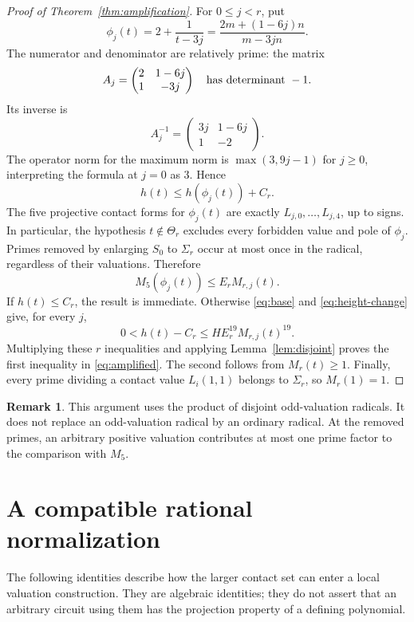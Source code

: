 \documentclass[11pt,a4paper]{article}
\theoremstyle{definition}\newtheorem{definition}[theorem]{Definition}
\newtheorem{remark}[theorem]{Remark}
\begin{document}
\begin{proof}[Proof of Theorem~\ref{thm:amplification}]
For $0\le j<r$, put
\[
 \phi_j(t)=2+\frac1{t-3j}
          =\frac{2m+(1-6j)n}{m-3jn}.
\]
The numerator and denominator are relatively prime: the matrix
\[
 A_j=\begin{pmatrix}2&1-6j\\1&-3j\end{pmatrix}
 \quad\hbox{has determinant }-1.
\]
Its inverse is
\[
 A_j^{-1}=\begin{pmatrix}3j&1-6j\\1&-2\end{pmatrix}.
\]
The operator norm for the maximum norm is
$\max(3,9j-1)$ for $j\ge0$, interpreting the formula at $j=0$
as $3$. Hence
\begin{equation}\label{eq:height-change}
 h(t)\le h(\phi_j(t))+C_r.
\end{equation}
The five projective contact forms for $\phi_j(t)$ are exactly
$L_{j,0},\ldots,L_{j,4}$, up to signs. In particular, the hypothesis
$t\notin\Theta_r$ excludes every forbidden value and pole of
$\phi_j$. Primes removed by enlarging $S_0$ to $\Sigma_r$ occur
at most once in the radical, regardless of their valuations.
Therefore
\[
 M_5(\phi_j(t))\le E_r M_{r,j}(t).
\]
If $h(t)\le C_r$, the result is immediate. Otherwise
\eqref{eq:base} and \eqref{eq:height-change} give, for every $j$,
\[
 0<h(t)-C_r\le HE_r^{19}M_{r,j}(t)^{19}.
\]
Multiplying these $r$ inequalities and applying
Lemma~\ref{lem:disjoint} proves the first inequality in
\eqref{eq:amplified}. The second follows from $M_r(t)\ge1$.
Finally, every prime dividing a contact value $L_i(1,1)$ belongs
to $\Sigma_r$, so $M_r(1)=1$.
\end{proof}

\begin{remark}
This argument uses the product of disjoint odd-valuation radicals.
It does not replace an odd-valuation radical by an ordinary radical.
At the removed primes, an arbitrary positive valuation contributes
at most one prime factor to the comparison with $M_5$.
\end{remark}

\section{A compatible rational normalization}

The following identities describe how the larger contact set can
enter a local valuation construction. They are algebraic identities;
they do not assert that an arbitrary circuit using them has the
projection property of a defining polynomial.
\end{document}
